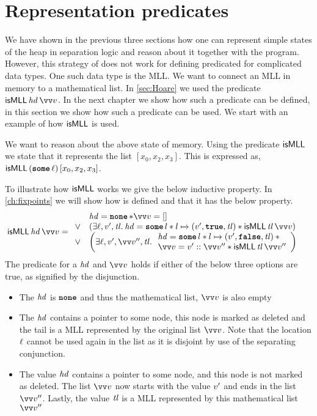 \documentclass[thesis.tex]{subfiles}
\begin{document}
\section{Representation predicates}
\label{sec:represpreds}
We have shown in the previous three sections how one can represent simple states of the heap in separation logic and reason about it together with the program. However, this strategy of does not work for defining predicated for complicated data types. One such data type is the MLL. We want to connect an MLL in memory to a mathematical list. In \cref*{sec:Hoare} we used the predicate $\isMLL\, \hd\, \vect{v}$. In the next chapter we show how such a predicate can be defined, in this section we show how such a predicate can be used. We start with an example of how $\textsf{\upshape isMLL}$ is used.
\begin{center}
\end{center}
We want to reason about the above state of memory. Using the predicate $\textsf{\upshape isMLL}$ we state that it represents the list $[x_0, x_2, x_3]$. This is expressed as, $\textsf{\upshape isMLL}\,(\operatorname{\texttt{\upshape \bfseries some}}\ell)\,[x_0,x_2,x_3]$.

To illustrate how $\textsf{\upshape isMLL}$ works we give the below inductive property. In \cref*{ch:fixpoints} we will show how \isMLL is defined and that it has the below property.
\begin{align*}
  \isMLL\, \hd\, \vect{\val} & =
  \isMLLRecDef
\end{align*}
The predicate \isMLL for a $\mathit{hd}$ and $\vect{\val}$ holds if either of the below three options are true, as signified by the disjunction.
\begin{itemize}
  \item The $\mathit{hd}$ is $\operatorname{\texttt{\upshape \bfseries none}}$ and thus the mathematical list, $\vect{\val}$ is also empty
  \item The $\mathit{hd}$ contains a pointer to some node, this node is marked as deleted and the tail is a MLL represented by the original list $\vect{\val}$. Note that the location $\ell$ cannot be used again in the list as it is disjoint by use of the separating conjunction.
  \item The value $\mathit{hd}$ contains a pointer to some node, and this node is not marked as deleted. The list $\vect{\val}$ now starts with the value $v'$ and ends in the list $\vect{\val}''$. Lastly, the value $\mathit{tl}$ is a MLL represented by this mathematical list $\vect{\val}''$
\end{itemize}
\end{document}
